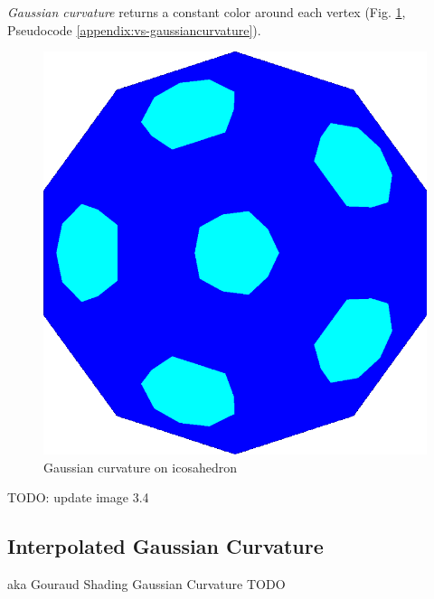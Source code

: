 \textit{Gaussian curvature} returns a constant color around each vertex (Fig. \ref{fig:gc-icosahedron}, Pseudocode \ref{appendix:vs-gaussiancurvature}).
\begin{figure}[h]
    \centering
    \includegraphics[scale=0.2]{images/gaussian-ball.png}
    \caption{Gaussian curvature on icosahedron}\label{fig:gc-icosahedron}
\end{figure}
TODO: update image 3.4

\subsection{Interpolated Gaussian Curvature}
aka Gouraud Shading Gaussian Curvature
TODO

